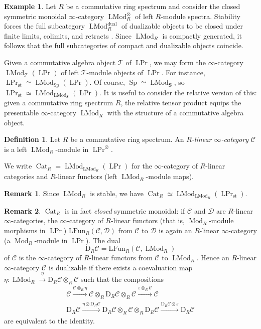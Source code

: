 \documentclass{article}
\theoremstyle{definition}
\newtheorem{definition}{Definition}[subsection]
\newtheorem{example}{Example}[subsection]
\newtheorem{remark}{Remark}[subsection]
\newcommand{\C}{\mathcal{C}}
\newcommand{\D}{\mathcal{D}}
\newcommand{\T}{\mathcal{T}}
\renewcommand{\SS}{\mathbf{S}}
\renewcommand{\i}{\infty}
\DeclareMathOperator{\LMod}{LMod}
\newcommand{\Dual}{\mathrm{D}}
\DeclareMathOperator{\Mod}{Mod}
\DeclareMathOperator{\Cat}{Cat}
\newcommand{\Funl}{\mathrm{LFun}}
\DeclareMathOperator{\Prl}{LPr}
\DeclareMathOperator{\Sp}{Sp}
\newcommand{\st}{\mathrm{st}}
\renewcommand{\epsilon}{\varepsilon}
\begin{document}
\begin{example}
Let $R$ be a commutative ring spectrum and consider the closed symmetric monoidal $\i$-category $\LMod_R^\otimes$ of left $R$-module spectra.
Stability forces the full subcategory $\LMod_R^{\mathrm{dual}}$ of dualizable objects to be closed under finite limits, colimits, and retracts \cite[Theorem 2.1.3]{HPS}.
Since $\LMod_R$ is compactly generated, it follows that the full subcategories of compact and dualizable objects coincide.
\end{example}

Given a commutative algebra object $\T$ of $\Prl$, we may form the $\i$-category $\LMod_{\T}(\Prl)$ of left $\T$-module objects of $\Prl$. For instance, $\Prl_\st\simeq\LMod_{\Sp}(\Prl)$.
Of course, $\Sp\simeq\LMod_\SS$, so $\Prl_\st\simeq\LMod_{\LMod_\SS}(\Prl)$.
It is useful to consider the relative version of this: given a commutative ring spectrum $R$, the relative tensor product equips the presentable $\i$-category $\LMod_R$ with the structure of a commutative algebra object.
\begin{definition}
Let $R$ be a commutative ring spectrum.
An {\em $R$-linear $\i$-category} $\C$ is a left $\LMod_R$-module in $\Prl^\otimes$.
\end{definition}
We write $\Cat_R=\LMod_{\LMod_R}(\Prl)$
for the $\i$-category of $R$-linear categories and $R$-linear functors (left $\LMod_R$-module maps).
\begin{remark}
Since $\LMod_R$ is stable, we have
$\Cat_R\simeq\LMod_{\LMod_R}(\Prl_{\st})$.
\end{remark}

\begin{remark}
$\Cat_R$ is in fact {\em closed} symmetric monoidal: if $\C$ and $\D$ are $R$-linear $\i$-categories, the $\i$-category of $R$-linear functors (that is, $\Mod_R$-module morphisms in $\Prl$)
$
\Funl_R(\C,\D)
$
from $\C$ to $\D$ is again an $R$-linear $\i$-category (a $\Mod_R$-module in $\Prl$).
The dual
\begin{equation*}
    \mathrm{D}_R\C=\Funl_R(\C,\LMod_R)
\end{equation*}
of $\C$ is the $\i$-category of $R$-linear functors from $\C$ to $\LMod_R$.
Hence an $R$-linear $\i$-category $\C$ is dualizable if there exists a coevaluation map $\eta: \LMod_R\xrightarrow{\eta}\Dual_R\C\otimes_R\C$ such that the compositions
\begin{gather*}
\C\xrightarrow{\C\otimes_R\eta}\C\otimes_R\Dual_R\C\otimes_R\C\xrightarrow{\epsilon\otimes_R\C}\C\\
\Dual_R\C\xrightarrow{\eta\otimes\Dual_R\C}\Dual_R\C\otimes_R\C\otimes_R\Dual_R\C\xrightarrow{\Dual_R\C\otimes\epsilon}\Dual_R\C
\end{gather*}
are equivalent to the identity.
\end{remark}
\end{document}
